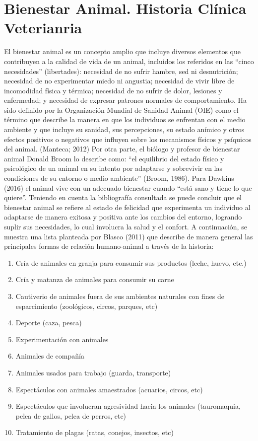 \chapter{Bienestar Animal. Historia Clínica Veterianria}\label{chapter:animalHealth}
El bienestar animal es un concepto amplio que incluye diversos elementos que contribuyen a la calidad de vida de un animal, incluidos los referidos en las “cinco necesidades” (libertades): necesidad de no sufrir hambre, sed ni desnutrición; necesidad de no experimentar miedo ni angustia; necesidad de vivir libre de incomodidad física y térmica; necesidad de no sufrir de dolor, lesiones y enfermedad; y necesidad de expresar patrones normales de comportamiento. 
Ha sido definido por la Organización Mundial de Sanidad Animal (OIE) como el término que describe la manera en que los individuos se enfrentan con el medio ambiente y que incluye su sanidad, sus percepciones, su estado anímico y otros efectos positivos o negativos que influyen sobre los mecanismos físicos y psíquicos del animal. (Manteca; 2012)
Por otra parte, el biólogo y profesor de bienestar animal Donald Broom lo describe como: “el equilibrio del estado físico y psicológico de un animal en su intento por adaptarse y sobrevivir en las condiciones de su entorno o medio ambiente” (Broom, 1986). Para Dawkins (2016) el animal vive con un adecuado bienestar cuando “está sano y tiene lo que quiere”.
Teniendo en cuenta la bibliografía consultada se puede concluir que el bienestar animal se refiere al estado de felicidad que experimenta un individuo al adaptarse de manera exitosa y positiva ante los cambios del entorno, logrando suplir sus necesidades, lo cual involucra la salud y el confort.
A continuación, se muestra una lista planteada por Blasco (2011) que describe de manera general las principales formas de relación humano-animal a través de la historia:
\begin{enumerate}
	\item Cría de animales en granja para consumir sus productos (leche, huevo, etc.)
\item  Cría y matanza de animales para consumir su carne
\item  Cautiverio de animales fuera de sus ambientes naturales con fines de esparcimiento (zoológicos, circos, parques, etc)
\item  Deporte (caza, pesca)
\item  Experimentación con animales
\item  Animales de compañía
\item  Animales usados para trabajo (guarda, transporte)
\item  Espectáculos con animales amaestrados (acuarios, circos, etc)
\item  Espectáculos que involucran agresividad hacia los animales (tauromaquia, pelea de gallos, pelea de perros, etc)
\item  Tratamiento de plagas (ratas, conejos, insectos, etc)

\end{enumerate}

